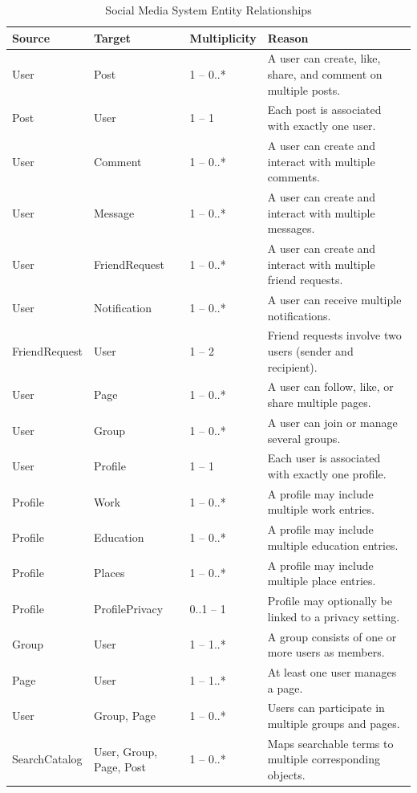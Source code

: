 \begin{table}[h!]
\centering
\begin{tabularx}{\textwidth}{|X|X|X|X|}
\hline
\textbf{Source} & \textbf{Target} & \textbf{Multiplicity} & \textbf{Reason} \\
\hline
User & Post & 1 – 0..* & A user can create, like, share, and comment on multiple posts. \\
\hline
Post & User & 1 – 1 & Each post is associated with exactly one user. \\
\hline
User & Comment & 1 – 0..* & A user can create and interact with multiple comments. \\
\hline
User & Message & 1 – 0..* & A user can create and interact with multiple messages. \\
\hline
User & FriendRequest & 1 – 0..* & A user can create and interact with multiple friend requests. \\
\hline
User & Notification & 1 – 0..* & A user can receive multiple notifications. \\
\hline
FriendRequest & User & 1 – 2 & Friend requests involve two users (sender and recipient). \\
\hline
User & Page & 1 – 0..* & A user can follow, like, or share multiple pages. \\
\hline
User & Group & 1 – 0..* & A user can join or manage several groups. \\
\hline
User & Profile & 1 – 1 & Each user is associated with exactly one profile. \\
\hline
Profile & Work & 1 – 0..* & A profile may include multiple work entries. \\
\hline
Profile & Education & 1 – 0..* & A profile may include multiple education entries. \\
\hline
Profile & Places & 1 – 0..* & A profile may include multiple place entries. \\
\hline
Profile & ProfilePrivacy & 0..1 – 1 & Profile may optionally be linked to a privacy setting. \\
\hline
Group & User & 1 – 1..* & A group consists of one or more users as members. \\
\hline
Page & User & 1 – 1..* & At least one user manages a page. \\
\hline
User & Group, Page & 1 – 0..* & Users can participate in multiple groups and pages. \\
\hline
SearchCatalog & User, Group, Page, Post & 1 – 0..* & Maps searchable terms to multiple corresponding objects. \\
\hline
\end{tabularx}
\caption{Social Media System Entity Relationships}
\label{tab:social_media_relationships}
\end{table}

